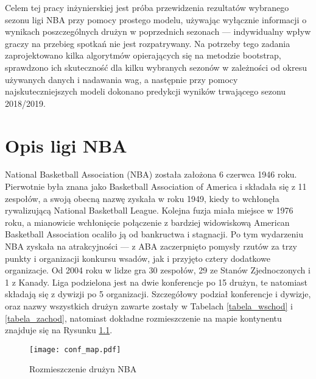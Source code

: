 \documentclass[inzynierska]{pwr_wmat_praca_dyplomowa}
\theoremstyle{plain}
\numberwithin{theorem}{chapter}
\theoremstyle{definition}
\numberwithin{theorem}{chapter}
\begin{document}
 Celem tej pracy inżynierskiej jest próba przewidzenia rezultatów wybranego sezonu ligi NBA przy pomocy prostego modelu, używając wyłącznie informacji o wynikach poszczególnych drużyn w poprzednich sezonach --- indywidualny wpływ graczy na przebieg spotkań nie jest rozpatrywany. Na potrzeby tego zadania zaprojektowano kilka algorytmów opierających się na metodzie bootstrap, sprawdzono ich skuteczność dla kilku wybranych sezonów w zależności od okresu używanych danych i nadawania wag, a następnie przy pomocy najskuteczniejszych modeli dokonano predykcji wyników trwającego sezonu 2018/2019. 



\chapter{Opis ligi NBA}\label{rodzial1}
National Basketball Association (NBA) została założona 6 czerwca 1946 roku. Pierwotnie była znana jako Basketball Association of America i składała się z 11 zespołów, a swoją obecną nazwę zyskała w roku 1949, kiedy to wchłonęła rywalizującą National Basketball League. Kolejna fuzja miała miejsce w 1976 roku, a mianowicie wchłonięcie połączenie z bardziej widowiskową American Basketball Association ocaliło ją od bankructwa i stagnacji. Po tym wydarzeniu NBA zyskała na atrakcyjności --- z ABA zaczerpnięto pomysły rzutów za trzy punkty i organizacji konkursu wsadów, jak i przyjęto cztery dodatkowe organizacje. \cite{history} Od 2004 roku w lidze gra 30 zespołów, 29 ze Stanów Zjednoczonych i 1 z Kanady. Liga podzielona jest na dwie konferencje po 15 drużyn, te natomiast składają się z dywizji po 5 organizacji. Szczegółowy podział konferencje i dywizje, oraz nazwy wszystkich drużyn zawarte zostały w Tabelach \ref{tabela_wschod} i \ref{tabela_zachod}, natomiast dokładne rozmieszczenie na mapie kontynentu znajduje się na Rysunku \ref{mapa_stany}.\cite{mapa}

\begin{figure}[t]
	\texttt{[image: conf\_map.pdf]}
	\caption{Rozmieszczenie drużyn NBA}\label{mapa_stany}
	\centering
\end{figure}
\end{document}
